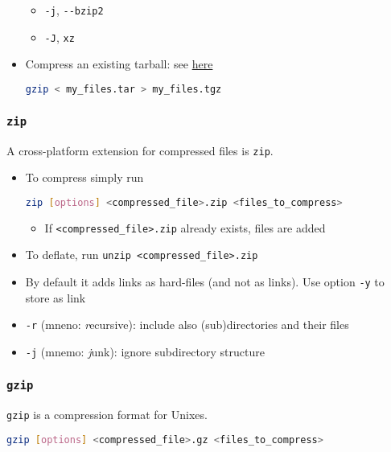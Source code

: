 \documentclass[a4paper,12pt,%
              final%
              ]{article}
\begin{document}
\begin{itemize}
\begin{itemize}
      \item \verb|-j|, \verb|--bzip2|
      \item \verb|-J|, \verb|xz|
    \end{itemize}
  \item Compress an existing tarball: see \href{https://unix.stackexchange.com/questions/457949/how-to-turn-a-tar-file-to-a-tgz-file}{here}
\begin{lstlisting}[language=bash]
gzip < my_files.tar > my_files.tgz
\end{lstlisting}
\end{itemize}

\subsubsection{\texttt{zip}}
A cross-platform extension for compressed files is \texttt{zip}.
\begin{itemize}
  \item To compress simply run
\begin{lstlisting}[language=bash]
zip [options] <compressed_file>.zip <files_to_compress>
\end{lstlisting}
    \begin{itemize}
      \item If \verb|<compressed_file>.zip| already exists, files are added
    \end{itemize}
  \item To deflate, run \verb|unzip <compressed_file>.zip|
  \item By default it adds links as hard-files (and not as links). Use option \verb|-y| to store as link
  \item \verb|-r| (mneno: \emph{r}ecursive): include also (sub)directories and their files
  \item \verb|-j| (mnemo: \emph{j}unk): ignore subdirectory structure
\end{itemize}

\subsubsection{\texttt{gzip}}
\texttt{gzip} is a compression format for Unixes.
\begin{lstlisting}[language=bash]
gzip [options] <compressed_file>.gz <files_to_compress>
\end{lstlisting}
\end{document}
